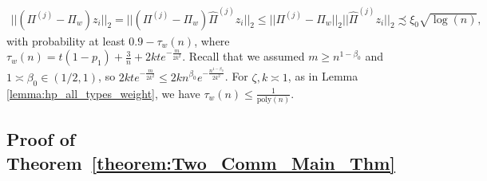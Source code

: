 \documentclass{article}
\begin{document}
\begin{align*}
||(\Pi^{(j)} - \Pi_w)z_i||_2 = ||(\Pi^{(j)} - \Pi_w)\hat{\Pi}^{(j)}z_i||_2 \leq ||\Pi^{(j)} - \Pi_w||_2||\hat{\Pi}^{(j)}z_i||_2 \precsim \xi_0\sqrt{\log(n)} ,
\end{align*}
with probability at least $0.9 - \tau_w(n)$, where  $\tau_w(n) = t(1 - p_1) + \frac{3}{n} + 2kte^{-\frac{m}{2k^2}}$. Recall that we assumed $m \geq n^{1 - \beta_0}$ and $1 \asymp \beta_0 \in (1/2, 1)$, so $2kte^{-\frac{m}{2k^2}} \leq 2kn^{\beta_0}e^{-\frac{n^{1 - \beta_0}}{2k^2}}$. For $\zeta, k \asymp 1$, as in Lemma \ref{lemma:hp_all_types_weight}, we have $\tau_w(n) \leq \frac{1}{\mathrm{poly}(n)}$.



\subsection{Proof of Theorem~\ref{theorem:Two_Comm_Main_Thm}}
\label{AppThmTwoCom}


\end{document}
